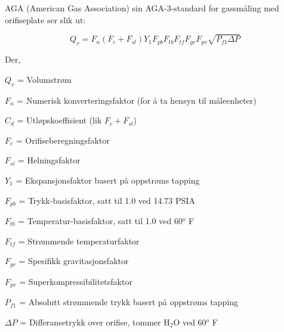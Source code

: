 \vskip 10pt

AGA (American Gas Association) sin AGA-3-standard for gassmåling med orifiseplate ser slik ut:


$$Q_v = F_n (F_c+F_{sl}) Y_1 F_{pb} F_{tb} F_{tf} F_{gr} F_{pv} \sqrt{P_{f1} \Delta P}$$

\noindent
Der,

$Q_v$ = Volumstrøm

$F_n$ = Numerisk konverteringsfaktor (for å ta hensyn til måleenheter)

$C_d$ = Utløpskoeffisient (lik $F_c + F_{sl}$)

$F_c$ = Orifiseberegningsfaktor

$F_{sl}$ = Helningsfaktor

$Y_1$ = Ekspansjonsfaktor basert på oppstrøms tapping

$F_{pb}$ = Trykk-basisfaktor, satt til 1.0 ved 14.73 PSIA

$F_{tb}$ = Temperatur-basisfaktor, satt til 1.0 ved 60$^{o}$ F

$F_{tf}$ = Strømmende temperaturfaktor

$F_{gr}$ = Spesifikk gravitasjonsfaktor

$F_{pv}$ = Superkompressibilitetsfaktor

$P_{f1}$ = Absolutt strømmende trykk basert på oppstrøms tapping

$\Delta P$ = Differansetrykk over orifise, tommer H$_{2}$O ved 60$^{o}$ F










